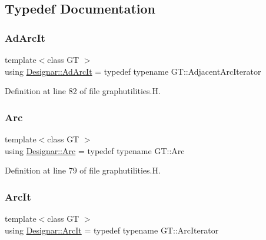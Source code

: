 \subsection{Typedef Documentation}
\mbox{\label{namespace_designar_a88b020661576bc09a536766283ec1790}} 
\subsubsection{\texorpdfstring{Ad\+Arc\+It}{AdArcIt}}
{\footnotesize\ttfamily template$<$class GT $>$ \\
using \hyperlink{namespace_designar_a88b020661576bc09a536766283ec1790}{Designar\+::\+Ad\+Arc\+It} = typedef typename G\+T\+::\+Adjacent\+Arc\+Iterator}



Definition at line 82 of file graphutilities.\+H.

\mbox{\label{namespace_designar_a3f55fb5513d62ff47cbc8f72b8e95d6f}} 
\subsubsection{\texorpdfstring{Arc}{Arc}}
{\footnotesize\ttfamily template$<$class GT $>$ \\
using \hyperlink{namespace_designar_a3f55fb5513d62ff47cbc8f72b8e95d6f}{Designar\+::\+Arc} = typedef typename G\+T\+::\+Arc}



Definition at line 79 of file graphutilities.\+H.

\mbox{\label{namespace_designar_a30ebaaade3ffa312c33d6e1234a96952}} 
\subsubsection{\texorpdfstring{Arc\+It}{ArcIt}}
{\footnotesize\ttfamily template$<$class GT $>$ \\
using \hyperlink{namespace_designar_a30ebaaade3ffa312c33d6e1234a96952}{Designar\+::\+Arc\+It} = typedef typename G\+T\+::\+Arc\+Iterator}



